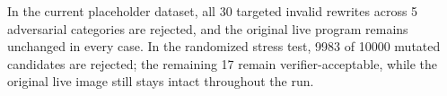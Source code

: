 In the current placeholder dataset, all 30 targeted invalid
rewrites across 5 adversarial categories are rejected, and
the original live program remains unchanged in every case. In the randomized
stress test, 9983 of 10000 mutated candidates are rejected;
the remaining 17 remain verifier-acceptable, while the original
live image still stays intact throughout the run.

